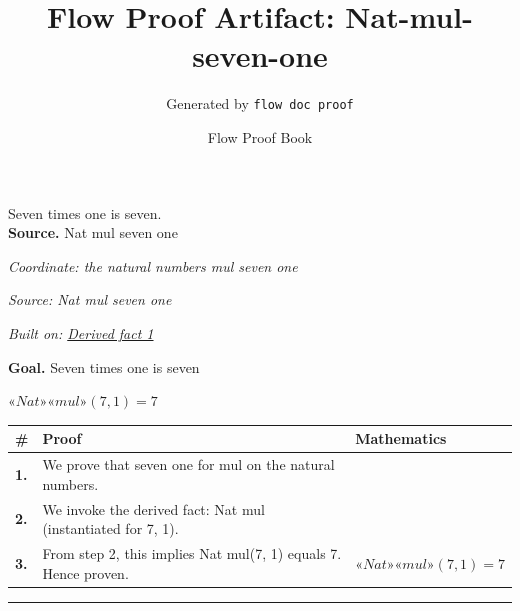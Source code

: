 \documentclass[11pt]{article}
\title{Flow Proof Artifact: Nat-mul-seven-one}
\author{Generated by \texttt{flow doc proof}}
\date{Flow Proof Book}
\theoremstyle{definition}
\begin{document}
\maketitle
Seven times one is seven.\\[0.5em]
\textbf{Source.} Nat mul seven one\\[0.5em]
\bigskip
{}\par
\smallskip\noindent\textit{Coordinate: the natural numbers \cdot mul \cdot seven one}\par
\smallskip\noindent\textit{Source: Nat mul seven one}\par
\smallskip\noindent\textit{Built on: \hyperref[thm:Nat-mul-seven_one]{Derived fact 1}}\par
\medskip
\noindent\textbf{Goal.} Seven times one is seven\par
\noindent$\displaystyle «Nat» «mul»(7, 1) = 7$\par
\medskip
\noindent
\begin{tabular}{@{} >{\raggedright\arraybackslash}p{} >{\raggedright\arraybackslash}p{} >{\raggedleft\arraybackslash}p{} @{}}
\textbf{\#} & \textbf{Proof} & \textbf{Mathematics} \\
\midrule
\textbf{1.} & We prove that seven one for mul on the natural numbers. & \\[0.45em]
\textbf{2.} & We invoke the derived fact: \guillemotleft{}Nat\guillemotright{} \guillemotleft{}mul\guillemotright{} (instantiated for 7, 1). & \\[0.45em]
\textbf{3.} & From step 2, this implies \guillemotleft{}Nat\guillemotright{} \guillemotleft{}mul\guillemotright{}(7, 1) equals 7. Hence proven. & $\displaystyle «Nat» «mul»(7, 1) = 7$ \\[0.45em]
\bottomrule
\end{tabular}
\label{thm:Nat-mul-seven_one}
\par\medskip\hrule
\end{document}

